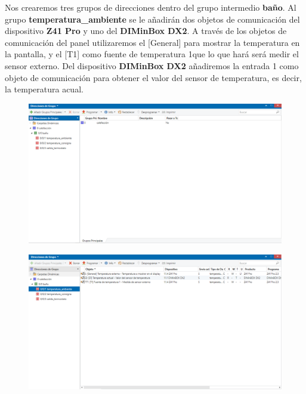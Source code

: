 \documentclass[10pt]{article}
\begin{document}
Nos crearemos tres grupos de direcciones dentro del grupo intermedio \textbf{baño}. Al grupo \textbf{temperatura\_ambiente} se le añadirán dos objetos de comunicación del dispositivo \textbf{Z41 Pro} y uno del \textbf{DIMinBox DX2}. A través de los objetos de comunicación del panel utilizaremos el [General] para mostrar la temperatura en la pantalla, y el [T1] como fuente de temperatura 1que lo que hará será medir el sensor externo. Del dispositivo \textbf{DIMinBox DX2} añadiremos la entrada 1 como objeto de comunicación para obtener el valor del sensor de temperatura, es decir, la temperatura acual. \\

\begin{figure}[H]
	\begin{center}
	 		\includegraphics[width = 1.00\textwidth]{Imagenes/img31}
	\end{center} 
\end{figure}

\begin{figure}[H]
	\begin{center}
	 		\includegraphics[width = 1.00\textwidth]{Imagenes/img32}
	\end{center} 
\end{figure}
\end{document}

